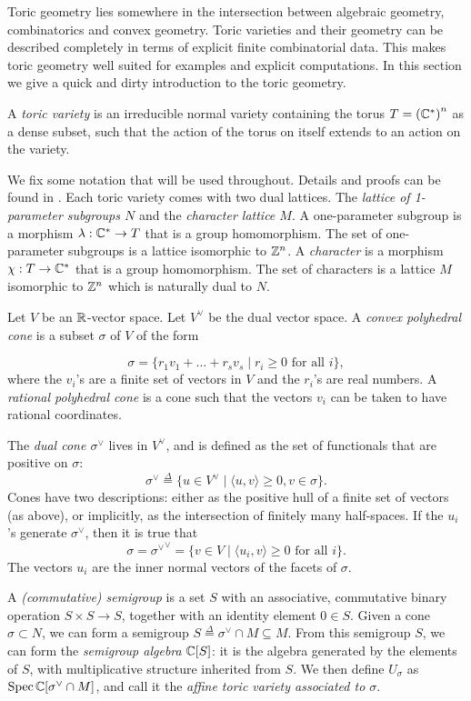 Toric geometry lies somewhere in the intersection between algebraic geometry, combinatorics and convex geometry. Toric varieties and their geometry can be described completely in terms of explicit finite combinatorial data. This makes toric geometry well suited for examples and explicit computations. In this section we give a quick and dirty introduction to the toric geometry.

\begin{definition}
A \emph{toric variety} is an irreducible normal variety containing the torus ${T={(\mathbb{C}^\ast)}^n}$  as a dense subset, such that the action of the torus on itself extends to an action on the variety.
\end{definition}

We fix some notation that will be used throughout. Details and proofs can be found in \cite{cox_toric,fulton_toric}. Each toric variety comes with two dual lattices. The \emph{lattice of 1-parameter subgroups $N$} and the \emph{character lattice $M$}. A one-parameter subgroup is a morphism $\lambda:\mathbb{C} ^\ast \to T$ that is a group homomorphism. The set of one-parameter subgroups is a lattice isomorphic to $\mathbb{Z}^n$. A \emph{character} is a morphism $\chi:T \to \mathbb{C}^\ast$ that is a group homomorphism. The set of characters is a lattice $M$ isomorphic to $\mathbb{Z}^n$ which is naturally dual to $N$.

Let $V$ be an $\mathbb{R}$-vector space. Let $V^\vee$ be the dual vector space. A \emph{convex polyhedral cone} is a subset $\sigma$ of $V$ of the form

$$
\sigma = \{ r_1 v_1 + \dots + r_s v_s \mid r_i \geq 0 \text{ for all } i \},
$$
where the $v_i$'s are a finite set of vectors in $V$ and the $r_i$'s are real numbers. A \emph{rational polyhedral cone} is a cone such that the vectors $v_i$ can be taken to have rational coordinates.

The \emph{dual cone $\sigma^\vee$} lives in $V^\vee$, and is defined as the set of functionals that are positive on $\sigma$:
$$
\sigma^\vee \stackrel{\Delta}{=} \{ u \in V^\vee \mid \langle u,v\rangle \geq 0, v \in \sigma \}.
$$
Cones have two descriptions: either as the positive hull of a finite set of vectors (as above), or implicitly, as the intersection of finitely many half-spaces. If the $u_i$'s generate $\sigma^\vee$, then it is true that
$$
\sigma = {\sigma^\vee}^ \vee  = \{ v \in V \mid \langle u_i,v \rangle \geq 0 \text{ for all } i \}.
$$
The vectors $u_i$ are the inner normal vectors of the facets of $\sigma$.

A \emph{(commutative) semigroup} is a set $S$ with an associative, commutative binary operation $S \times S \to S$, together with an identity element $0 \in S$. Given a cone $\sigma \subset N$, we can form a semigroup $S\stackrel{\Delta}{=} \sigma^\vee \cap M \subseteq M$. From this semigroup $S$, we can form the \emph{semigroup algebra} $\mathbb{C}[S]$: it is the algebra generated by the elements of $S$, with multiplicative structure inherited from $S$. We then define $U_\sigma$ as $\operatorname{Spec} \mathbb{C}[\sigma^\vee \cap M]$, and call it the \emph{affine toric variety associated to $\sigma$}. 

